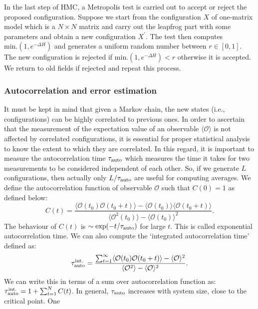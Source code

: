 \documentclass[letter,11pt]{article}
\begin{document}
\vspace{4mm} 
In the last step of HMC, a Metropolis test is carried out to accept or reject the proposed
configuration. Suppose we start from the configuration $X$ of one-matrix model 
which is a $N \times N$ matrix and carry out the leapfrog part with some parameters and obtain a new configuration 
$X^{\prime}$. The test then computes \texttt{$\text{min.}(1, e^{-\Delta H})$} and generates 
a uniform random number between $r \in [0,1]$. The new configuration is 
rejected if \texttt{$\text{min.}(1, e^{-\Delta H}) < r$} otherwise it is accepted. 
We return to old fields if rejected and repeat this process. 
\subsubsection{\label{sec:autocorr}Autocorrelation and error estimation} 
It must be kept in mind that given a Markov chain, the new states 
(i.e., configurations) can be highly correlated to previous ones. 
In order to ascertain that the measurement of the expectation value of an observable $\langle \mathcal{O} \rangle$ is not affected by correlated configurations, it is essential for proper statistical analysis to know the extent to which they are correlated. In this regard, it is important to measure
the autocorrelation time $ \tau_{\rm{auto}}$ which measures the time it takes for two measurements to be considered independent of each other. So, if we generate $L$ configurations, then actually only $L/\tau_{\rm{auto}}$ are useful for computing averages.
We define the autocorrelation function of observable $\mathcal{O}$ such that
$C(0) = 1$ as defined below:
 \begin{equation}
 	C(t) = \frac{\langle \mathcal{O}(t_0) \mathcal{O}(t_0 + t) \rangle - \langle \mathcal{O}(t_0)\rangle \langle \mathcal{O}(t_0 + t) \rangle}{\langle \mathcal{O}^2(t_0)\rangle - \langle \mathcal{O}(t_0)\rangle^{2}}.
 \end{equation}
The behaviour of $C(t)$ is $\sim \exp(-t/\tau_{\rm{auto}})$ for large $t$. This is called exponential autocorrelation time. We can also compute the `integrated autocorrelation time' defined as:
\begin{equation}
	\tau_{\rm{auto}}^{\rm{int.}} = \frac{\sum_{t=1}^{\infty} \langle \mathcal{O}(t_0) \mathcal{O}(t_0 + t) \rangle - \langle \mathcal{O} \rangle^2 }{\langle \mathcal{O}^2\rangle - \langle \mathcal{O}\rangle^{2}}.
\end{equation}
We can write this in terms of a sum over autocorrelation function as: $\tau_{\rm{auto}}^{\rm{int.}} = 1 + \sum_{t=1}^{N} C(t)$. In general, $ \tau_{\rm{auto}}$ increases with system size, close to the critical point. One 
\end{document}
